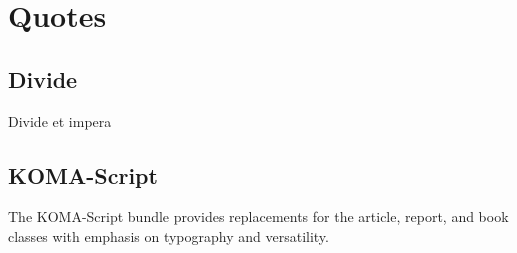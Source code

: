 \chapter{Quotes}
\section{Divide}\label{app:divice}
Divide et impera 

\section{KOMA-Script}\label{app:koma}
The KOMA-Script \cite{kohm93} bun­dle pro­vides re­place­ments for the ar­ti­cle, re­port, and book classes with em­pha­sis on ty­pog­ra­phy and ver­sa­til­ity. 